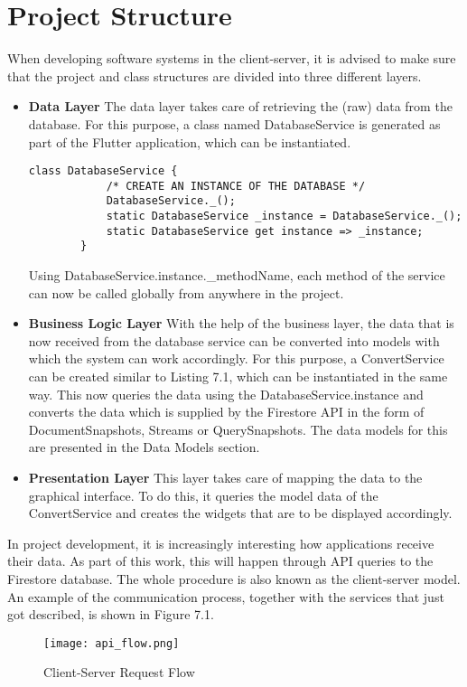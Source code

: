 \section{Project Structure}
When developing software systems in the client-server, it is advised to make sure that the project and class structures are divided into three different layers.
\begin{itemize}
	\item \textbf{Data Layer}
	\newline
	The data layer takes care of retrieving the (raw) data from the database. For this purpose, a class named DatabaseService is generated as part of the Flutter application, which can be instantiated.
	\scriptsize
		\begin{lstlisting}[caption=Stepper for Body Part Selection]
		class DatabaseService {
			/* CREATE AN INSTANCE OF THE DATABASE */
			DatabaseService._();
			static DatabaseService _instance = DatabaseService._();
			static DatabaseService get instance => _instance;
		}
		\end{lstlisting}
	\normalsize
	Using DatabaseService.instance.\_methodName, each method of the service can now be called globally from anywhere in the project.
	\item \textbf{Business Logic Layer}
	\newline
	With the help of the business layer, the data that is now received from the database service can be converted into models with which the system can work accordingly. For this purpose, a ConvertService can be created similar to Listing 7.1, which can be instantiated in the same way. This now queries the data using the DatabaseService.instance and converts the data which is supplied by the Firestore API in the form of DocumentSnapshots, Streams or QuerySnapshots. The data models for this are presented in the Data Models section.
	\item \textbf{Presentation Layer}
	\newline
	This layer takes care of mapping the data to the graphical interface. To do this, it queries the model data of the ConvertService and creates the widgets that are to be displayed accordingly.
\end{itemize}
In project development, it is increasingly interesting how applications receive their data. As part of this work, this will happen through API queries to the Firestore database. The whole procedure is also known as the client-server model. An example of the communication process, together with the services that just got described, is shown in Figure 7.1. 
\begin{figure}[H]
	\centering
	\texttt{[image: api\_flow.png]}
	\caption[Client-Server Request Flow]{Client-Server Request Flow}
\end{figure}
\noindent
